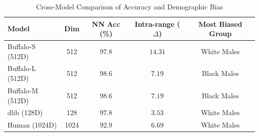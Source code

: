 \begin{table}[htbp]
\centering
\caption{Cross-Model Comparison of Accuracy and Demographic Bias}
\label{tab:model-comparison}
\small
\begin{tabular}{lcccc}
\toprule
Model & Dim & NN Acc (\%) & Intra-range ($\Delta$) & Most Biased Group \\
\midrule
Buffalo-S (512D) & 512 & $97.8$ & $14.31$ & White Males \\
Buffalo-L (512D) & 512 & $98.6$ & $7.19$ & Black Males \\
Buffalo-M (512D) & 512 & $98.6$ & $7.19$ & Black Males \\
dlib (128D) & 128 & $97.8$ & $3.53$ & White Males \\
Human (1024D) & 1024 & $92.9$ & $6.69$ & White Males \\
\bottomrule
\end{tabular}
\end{table}
